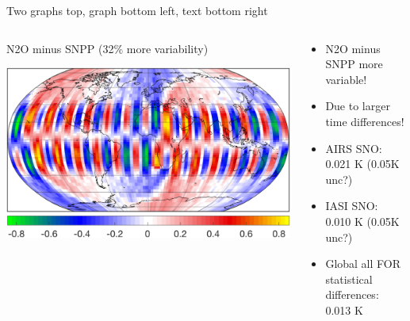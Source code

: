 \documentclass[10pt,t]{beamer}
\begin{document}
\begin{frame}[label={sec:org791e503}]{Two graphs top, graph bottom left, text bottom right}
  \vspace{-0.1in}
  \begin{columns}
    \begin{column}{0.55\columnwidth}
      \begin{block}{\footnotesize N2O minus SNPP (32\% more variability)}
        \vspace{-0.05in}
        \vspace{-0.05in}
        \begin{center}
          \includegraphics[width=0.95\linewidth]{./testfig.png}
        \end{center}
      \end{block}
    \end{column}

    \begin{column}{0.55\columnwidth}
      \begin{block}{}
        \vspace{-0.1in}
        \begin{itemize}
        \item N2O minus SNPP more variable!
        \item Due to larger time differences!
        \item AIRS SNO: 0.021 K  (0.05K unc?)
        \item IASI SNO: 0.010 K  (0.05K unc?)
        \item Global all FOR statistical differences: 0.013 K
        \end{itemize}
      \end{block}
    \end{column}
  \end{columns}
\end{frame}
\end{document}
